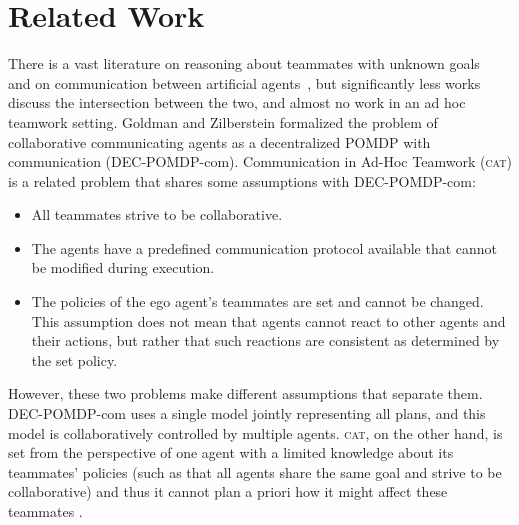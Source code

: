 \documentclass[letterpaper]{article}
\begin{document}

\section{Related Work}
There is a vast literature on reasoning about teammates with unknown goals~\cite{fern2007decision,albrecht2018autonomous} and on communication between artificial agents~\cite{cohen1997team,decker1987distributed,pynadath2002communicative}, but significantly less works discuss the intersection between the two, and almost no work in an ad hoc teamwork setting.
Goldman and Zilberstein  formalized the problem of collaborative communicating agents as a decentralized POMDP with communication (DEC-POMDP-com).
Communication in Ad-Hoc Teamwork (\textsc{cat}) is a related problem that shares some assumptions with DEC-POMDP-com:
\begin{itemize}
    \item All teammates strive to be collaborative.
    \item The agents have a predefined communication protocol available that cannot be modified during execution.
    \item The policies of the ego agent's teammates are set and cannot be changed.  This assumption does not mean that agents cannot react to other agents and their actions, but rather that such reactions are consistent as determined by the set policy.
\end{itemize}
However, these two problems make different assumptions that separate them. DEC-POMDP-com uses a single model jointly representing all plans, and this model is collaboratively controlled by multiple agents. \textsc{cat}, on the other hand, is set from the perspective of one agent with a limited knowledge about its teammates' policies (such as that all agents share the same goal and strive to be collaborative) and thus it cannot plan a priori how it might affect these teammates \cite{stone2013teaching,ravula2019ad}.
\end{document}
